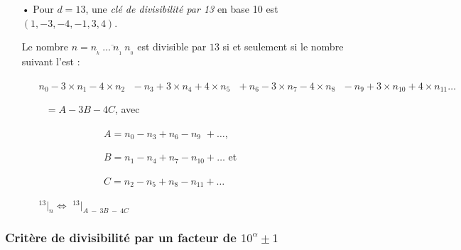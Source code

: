\documentclass[a4paper, twoside]{article}
\begin{document}
\begin{small}
\begin{itemize}
		\vspace{0.5cm}
		
		\item[•] Pour $d = 13$, une \textit{clé de divisibilité par 13} en base 10 est $(1, -3, -4, -1, 3, 4)$.
		
		\vspace{0.2cm}
		
		Le nombre $n = \overline{n_{_{k}}~\dots~n_{_1}~n_{_0}}$ est divisible par $13$ si et seulement si le nombre suivant l'est :
		
		\vspace{0.2cm}
		
		\begin{itemize}
			\item[] $n_0 - 3 \times n_1 - 4 \times n_2 ~~~ - n_3 + 3 \times n_4 + 4 \times n_5 ~~~ + n_6 - 3 \times n_7 - 4 \times n_8 ~~~ - n_9 + 3 \times n_{10} + 4 \times n_{11}\dots$ 
			\item[] $~~~ = A - 3B - 4C$, avec 
			
			\begin{itemize}
				\item[] ~~~~~~~~~ $A = n_0 - n_3 + n_6 - n_{9\phantom{0}}    + \dots$, 
				\item[] ~~~~~~~~~ $B = n_1 - n_4 + n_7 - n_{10} + \dots$ 	et  	
				\item[] ~~~~~~~~~ $C = n_2 - n_5 + n_8 - n_{11} + \dots$
			\end{itemize}
			
			\vspace{0.2cm}		
			
			\item[] {\Large $ ^{13}|_n \Leftrightarrow$ $^{13}|_{A~-~3B~-~4C} $}\\
			
		\end{itemize}
		

	\end{itemize}
	\end{small}

	\newpage







	\subsubsection*{Critère de divisibilité par un facteur de {\boldmath $10^{\alpha} \pm 1$}}\label{subsection_critere_10_plus_ou_moins_1}
\end{document}
